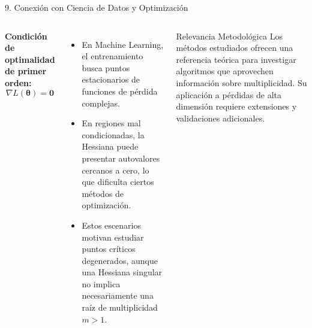 \documentclass[aspectratio=169,10pt]{beamer}
\begin{document}
\begin{frame}{9. Conexión con Ciencia de Datos y Optimización}
  \begin{columns}
    \textbf{Condición de optimalidad de primer orden:}
    $$\nabla L(\boldsymbol{\theta}) = \mathbf{0}$$
    \begin{itemize}
      \item En Machine Learning, el entrenamiento busca puntos estacionarios de funciones de pérdida complejas.
      \item En regiones mal condicionadas, la Hessiana puede presentar autovalores cercanos a cero, lo que dificulta ciertos métodos de optimización.
      \item Estos escenarios motivan estudiar puntos críticos degenerados, aunque una Hessiana singular no implica necesariamente una raíz de multiplicidad $m>1$.
    \end{itemize}
    \begin{block}{Relevancia Metodológica}
      Los métodos estudiados ofrecen una referencia teórica para investigar algoritmos que aprovechen información sobre multiplicidad. Su aplicación a pérdidas de alta dimensión requiere extensiones y validaciones adicionales.
    \end{block}
  \end{columns}
\end{frame}
\end{document}
